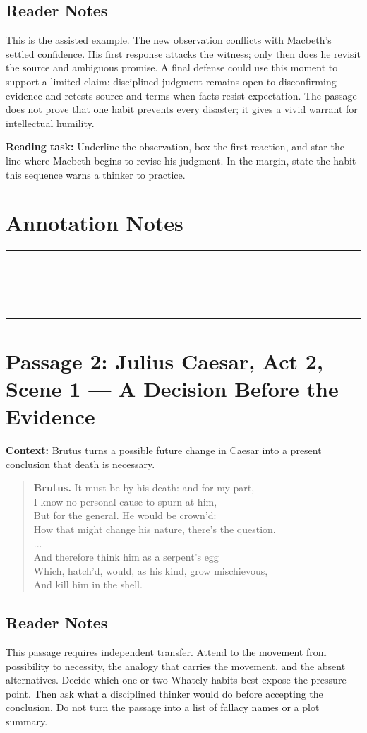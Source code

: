 \documentclass[12pt]{article}
\newenvironment{playpassage}{\begin{quote}\footnotesize\setlength{\parskip}{0.08em}\setlength{\parindent}{0pt}}{\end{quote}}
\newcommand{\speaker}[1]{\textbf{#1.}}
\begin{document}
\subsection*{Reader Notes}
This is the assisted example. The new observation conflicts with Macbeth's settled confidence. His first response attacks the witness; only then does he revisit the source and ambiguous promise. A final defense could use this moment to support a limited claim: disciplined judgment remains open to disconfirming evidence and retests source and terms when facts resist expectation. The passage does not prove that one habit prevents every disaster; it gives a vivid warrant for intellectual humility.

\textbf{Reading task:} Underline the observation, box the first reaction, and star the line where Macbeth begins to revise his judgment. In the margin, state the habit this sequence warns a thinker to practice.

\vfill
\section*{Annotation Notes}
\noindent\rule{\textwidth}{0.4pt}\\[1.0em]
\rule{\textwidth}{0.4pt}\\[1.0em]
\rule{\textwidth}{0.4pt}

\newpage
\section*{Passage 2: Julius Caesar, Act 2, Scene 1 --- A Decision Before the Evidence}
\textbf{Context:} Brutus turns a possible future change in Caesar into a present conclusion that death is necessary.
\begin{playpassage}
\speaker{Brutus} It must be by his death: and for my part,\\
I know no personal cause to spurn at him,\\
But for the general. He would be crown'd:\\
How that might change his nature, there's the question.\\
...\\
And therefore think him as a serpent's egg\\
Which, hatch'd, would, as his kind, grow mischievous,\\
And kill him in the shell.
\end{playpassage}

\subsection*{Reader Notes}
This passage requires independent transfer. Attend to the movement from possibility to necessity, the analogy that carries the movement, and the absent alternatives. Decide which one or two Whately habits best expose the pressure point. Then ask what a disciplined thinker would do before accepting the conclusion. Do not turn the passage into a list of fallacy names or a plot summary.
\end{document}
